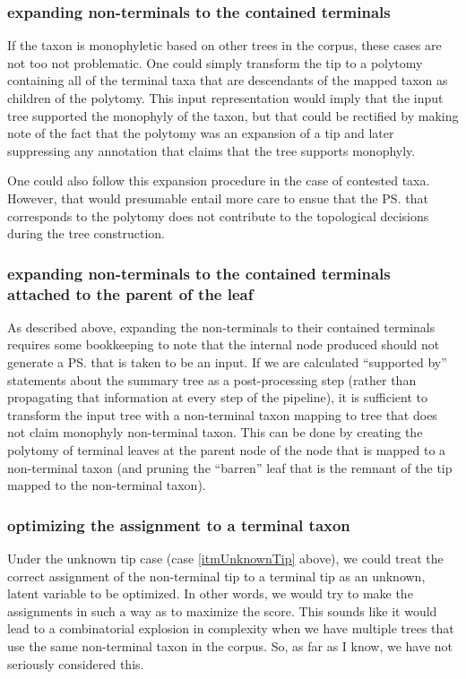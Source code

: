 \documentclass[11pt]{article}
\begin{document}
\subsubsection{expanding non-terminals to the contained terminals}
If the taxon is monophyletic based on other trees in the corpus, these cases are not too not problematic.
One could simply transform the tip to a polytomy containing all of the terminal taxa that are
    descendants of the mapped taxon as children of the polytomy.
This input representation would imply that the input tree supported the monophyly of the taxon, but 
    that could be rectified by making note of the fact that the polytomy was an expansion of a tip
    and later suppressing any annotation that claims that the tree supports monophyly.

One could also follow this expansion procedure in the case of contested taxa.
However, that would presumable entail more care to ensue that the \ps that corresponds
    to the polytomy does not contribute to the topological decisions during the 
    tree construction.

\subsubsection{expanding non-terminals to the contained terminals attached to the parent of the leaf}\label{expandNonTermPar}
As described above, expanding the non-terminals to their contained terminals requires 
    some bookkeeping to note that the internal node produced should not generate a \ps that
    is taken to be an input.
If we are calculated ``supported by'' statements about the summary tree as a post-processing step (rather
    than propagating that information at every step of the pipeline), it is sufficient
    to transform the input tree with a non-terminal taxon mapping to tree that does not
    claim monophyly non-terminal taxon.
This can be done by creating the polytomy of terminal leaves at the parent node of the node that is
    mapped to a non-terminal taxon (and pruning the ``barren'' leaf that is the remnant of the tip
    mapped to the non-terminal taxon).

\subsubsection{optimizing the assignment to a terminal taxon}
Under the unknown tip case (case \ref{itmUnknownTip} above), we could treat the
    correct assignment of the non-terminal tip to a terminal tip as an
    unknown, latent variable to be optimized.
In other words, we would try to make the assignments in such a way as to
    maximize the \SWIPSD score.
This sounds like it would lead to a combinatorial explosion in complexity when 
    we have multiple trees that use the same non-terminal taxon in the corpus.
So, as far as I know, we have not seriously considered this.
\end{document}
